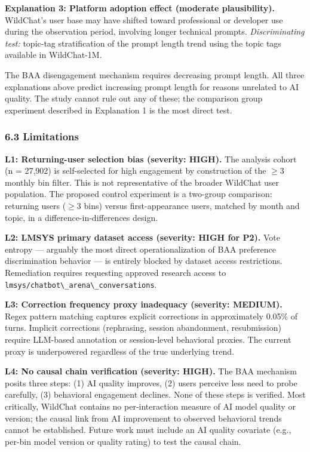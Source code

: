 \textbf{Explanation 3: Platform adoption effect (moderate plausibility).} WildChat's user base may have shifted toward professional or developer use during the observation period, involving longer technical prompts. \textit{Discriminating test:} topic-tag stratification of the prompt length trend using the topic tags available in WildChat-1M.

The BAA disengagement mechanism requires decreasing prompt length. All three explanations above predict increasing prompt length for reasons unrelated to AI quality. The study cannot rule out any of these; the comparison group experiment described in Explanation 1 is the most direct test.

\subsubsection{6.3 Limitations}

\textbf{L1: Returning-user selection bias (severity: HIGH).} The analysis cohort (n = 27,902) is self-selected for high engagement by construction of the $\geq 3$ monthly bin filter. This is not representative of the broader WildChat user population. The proposed control experiment is a two-group comparison: returning users ($\geq 3$ bins) versus first-appearance users, matched by month and topic, in a difference-in-differences design.

\textbf{L2: LMSYS primary dataset access (severity: HIGH for P2).} Vote entropy --- arguably the most direct operationalization of BAA preference discrimination behavior --- is entirely blocked by dataset access restrictions. Remediation requires requesting approved research access to \texttt{lmsys/chatbot\textbackslash \_arena\textbackslash \_conversations}.

\textbf{L3: Correction frequency proxy inadequacy (severity: MEDIUM).} Regex pattern matching captures explicit corrections in approximately 0.05\% of turns. Implicit corrections (rephrasing, session abandonment, resubmission) require LLM-based annotation or session-level behavioral proxies. The current proxy is underpowered regardless of the true underlying trend.

\textbf{L4: No causal chain verification (severity: HIGH).} The BAA mechanism posits three steps: (1) AI quality improves, (2) users perceive less need to probe carefully, (3) behavioral engagement declines. None of these steps is verified. Most critically, WildChat contains no per-interaction measure of AI model quality or version; the causal link from AI improvement to observed behavioral trends cannot be established. Future work must include an AI quality covariate (e.g., per-bin model version or quality rating) to test the causal chain.


